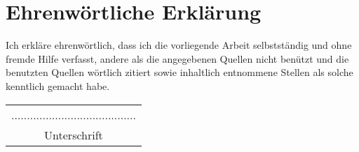 
\chapter*{Ehrenw\"{o}rtliche Erkl\"{a}rung}

Ich erkl\"{a}re ehrenw\"{o}rtlich, dass ich die vorliegende
Arbeit selbstst\"{a}ndig und ohne fremde Hilfe verfasst, andere als
die angegebenen Quellen nicht ben\"{u}tzt und die benutzten Quellen
w\"{o}rtlich zitiert sowie inhaltlich entnommene Stellen als solche
kenntlich gemacht habe. \\

\vspace{1 cm} \hfill
\begin{tabular*}{4.4 cm}{c}
........................................ \\
Unterschrift \\
\end{tabular*}